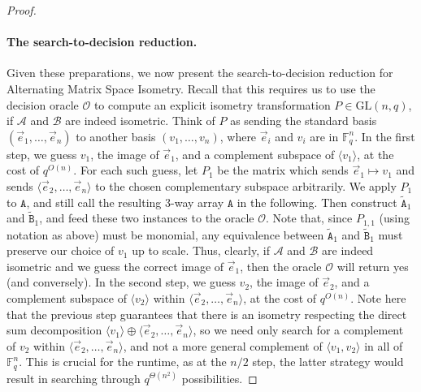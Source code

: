 \begin{proof}
\paragraph{The search-to-decision reduction.} Given these preparations, we now present the search-to-decision reduction for Alternating Matrix Space Isometry. Recall that this requires us to use the decision oracle $\mathcal O$ to compute an explicit isometry transformation $P\in\mathrm{GL}(n,q)$, if $\mathcal A$ and $\mathcal B$ are indeed isometric. Think of $P$ as sending the standard basis $(\vec e_1,\ldots,\vec e_n)$ to another basis $(v_1,\ldots,v_n)$, where $\vec e_i$ and $v_i$ are in $\mathbb F_q^n$.
In the first step, we guess $v_1$, the image of $\vec e_1$, and a complement subspace of $\langle v_1\rangle$, at the cost of $q^{O(n)}$. For each such guess, let $P_1$ be the matrix which sends $\vec e_1\mapsto v_1$ and sends $\langle\vec e_2,\ldots,\vec e_n\rangle$ to the chosen complementary subspace arbitrarily. We apply $P_1$ to $\mathtt A$, and still call the resulting 3-way array $\mathtt A$ in the following. Then construct $\widetilde{\mathtt A}_1$ and $\widetilde{\mathtt B}_1$, and feed these two instances to the oracle $\mathcal O$. Note that, since $P_{1,1}$ (using notation as above) must be monomial, any equivalence between $\widetilde{\mathtt A}_1$ and $\widetilde{\mathtt B}_1$ must preserve our choice of $v_1$ up to scale. Thus, clearly, if $\mathcal A$ and $\mathcal B$ are indeed isometric and we guess the correct image of $\vec e_1$, then the oracle $\mathcal O$ will return yes (and conversely).
In the second step, we guess $v_2$, the image of $\vec e_2$, and a complement subspace of $\langle v_2\rangle$ within $\langle\vec e_2,\ldots,\vec e_n\rangle$, at the cost of $q^{O(n)}$. Note here that the previous step guarantees that there is an isometry respecting the direct sum decomposition $\langle v_1\rangle\oplus\langle\vec e_2,\ldots,\vec e_n\rangle$, so we need only search for a complement of $v_2$ within $\langle\vec e_2,\ldots,\vec e_n\rangle$, and not a more general complement of $\langle v_1,v_2\rangle$ in all of $\mathbb F_q^n$. This is crucial for the runtime, as at the $n/2$ step, the latter strategy would result in searching through $q^{\Theta(n^2)}$ possibilities.

\end{proof}
